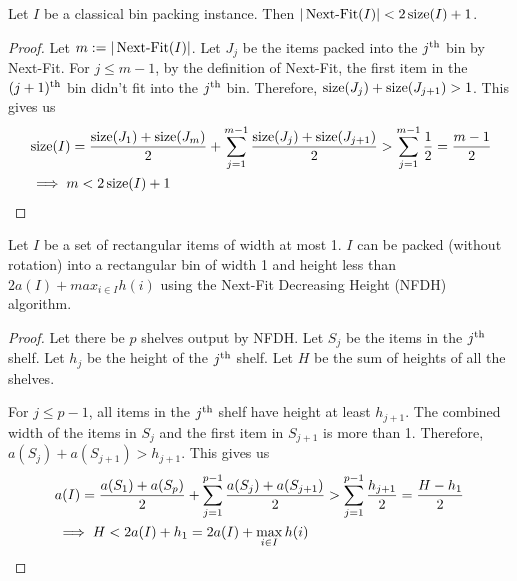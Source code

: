 \begin{lemma}
\label{thm:next-fit}
Let $I$ be a classical bin packing instance. Then
$|\operatorname{Next-Fit}(I)| < 2\operatorname{size}(I) + 1$.
\end{lemma}
\begin{proof}
Let $m := |\operatorname{Next-Fit}(I)|$.
Let $J_j$ be the items packed into the $j^{\textrm{th}}$ bin by Next-Fit.
For $j \le m-1$, by the definition of Next-Fit,
the first item in the $(j+1)^{\textrm{th}}$ bin didn't fit into the $j^{\textrm{th}}$ bin.
Therefore, $\operatorname{size}(J_j) + \operatorname{size}(J_{j+1}) > 1$. This gives us
\begin{align*}
& \operatorname{size}(I)
= \frac{\operatorname{size}(J_1) + \operatorname{size}(J_m)}{2} + \sum_{j=1}^{m-1} \frac{\operatorname{size}(J_j) + \operatorname{size}(J_{j+1})}{2}
> \sum_{j=1}^{m-1} \frac{1}{2} = \frac{m-1}{2}
\\ &\implies m < 2\operatorname{size}(I) + 1
\qedhere \end{align*}
\end{proof}

\begin{lemma}
\label{thm:nfdh-strip}
Let $I$ be a set of rectangular items of width at most 1.
$I$ can be packed (without rotation) into a rectangular bin of width 1
and height less than $2a(I) + max_{i \in I} h(i)$
using the Next-Fit Decreasing Height (NFDH) algorithm.
\end{lemma}
\begin{proof}
Let there be $p$ shelves output by NFDH.
Let $S_j$ be the items in the $j^{\textrm{th}}$ shelf.
Let $h_j$ be the height of the $j^{\textrm{th}}$ shelf.
Let $H$ be the sum of heights of all the shelves.

For $j \le p-1$, all items in the $j^{\textrm{th}}$ shelf have height at least $h_{j+1}$.
The combined width of the items in $S_j$ and the first item in $S_{j+1}$ is more than 1.
Therefore, $a(S_j) + a(S_{j+1}) > h_{j+1}$. This gives us
\begin{align*}
& a(I) = \frac{a(S_1) + a(S_p)}{2} + \sum_{j=1}^{p-1} \frac{a(S_j) + a(S_{j+1})}{2}
> \sum_{j=1}^{p-1} \frac{h_{j+1}}{2} = \frac{H-h_1}{2}
\\ &\implies H < 2a(I) + h_1 = 2a(I) + \max_{i \in I} h(i)
\qedhere \end{align*}
\end{proof}

